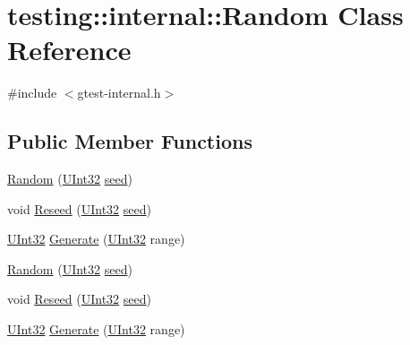 \hypertarget{classtesting_1_1internal_1_1_random}{}\section{testing\+::internal\+::Random Class Reference}
\label{classtesting_1_1internal_1_1_random}


{\ttfamily \#include $<$gtest-\/internal.\+h$>$}

\subsection*{Public Member Functions}
\begin{DoxyCompactItemize}
\item 
\mbox{\hyperlink{classtesting_1_1internal_1_1_random_a6e112be5e7cce00551f6383025f69460}{Random}} (\mbox{\hyperlink{namespacetesting_1_1internal_a436defbb8e92c8e94e33ebcc86f278ba}{U\+Int32}} \mbox{\hyperlink{_input_8h_af0f2cc4946f88de776f7ffa35e382fcb}{seed}})
\item 
void \mbox{\hyperlink{classtesting_1_1internal_1_1_random_adf2f24199318a46f885c78f50d89a69e}{Reseed}} (\mbox{\hyperlink{namespacetesting_1_1internal_a436defbb8e92c8e94e33ebcc86f278ba}{U\+Int32}} \mbox{\hyperlink{_input_8h_af0f2cc4946f88de776f7ffa35e382fcb}{seed}})
\item 
\mbox{\hyperlink{namespacetesting_1_1internal_a436defbb8e92c8e94e33ebcc86f278ba}{U\+Int32}} \mbox{\hyperlink{classtesting_1_1internal_1_1_random_a9315b7fb621cbcfdf92ed4b5e584c0db}{Generate}} (\mbox{\hyperlink{namespacetesting_1_1internal_a436defbb8e92c8e94e33ebcc86f278ba}{U\+Int32}} range)
\item 
\mbox{\hyperlink{classtesting_1_1internal_1_1_random_a6e112be5e7cce00551f6383025f69460}{Random}} (\mbox{\hyperlink{namespacetesting_1_1internal_a436defbb8e92c8e94e33ebcc86f278ba}{U\+Int32}} \mbox{\hyperlink{_input_8h_af0f2cc4946f88de776f7ffa35e382fcb}{seed}})
\item 
void \mbox{\hyperlink{classtesting_1_1internal_1_1_random_adf2f24199318a46f885c78f50d89a69e}{Reseed}} (\mbox{\hyperlink{namespacetesting_1_1internal_a436defbb8e92c8e94e33ebcc86f278ba}{U\+Int32}} \mbox{\hyperlink{_input_8h_af0f2cc4946f88de776f7ffa35e382fcb}{seed}})
\item 
\mbox{\hyperlink{namespacetesting_1_1internal_a436defbb8e92c8e94e33ebcc86f278ba}{U\+Int32}} \mbox{\hyperlink{classtesting_1_1internal_1_1_random_a9315b7fb621cbcfdf92ed4b5e584c0db}{Generate}} (\mbox{\hyperlink{namespacetesting_1_1internal_a436defbb8e92c8e94e33ebcc86f278ba}{U\+Int32}} range)

\end{DoxyCompactItemize}
